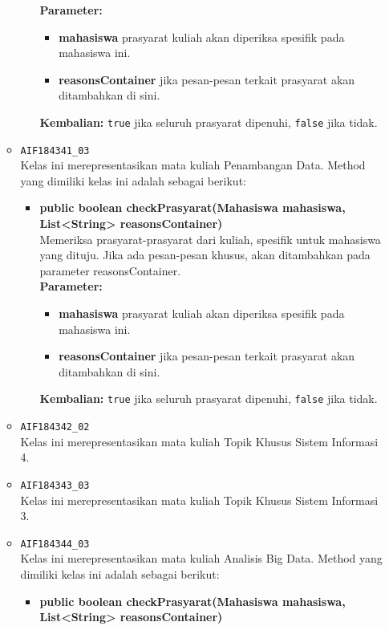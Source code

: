 \begin{enumerate}
\begin{itemize}
\begin{itemize}
			\textbf{Parameter:}
			\begin{itemize}
				\item \textbf{mahasiswa} prasyarat kuliah akan diperiksa spesifik pada mahasiswa ini.
				\item \textbf{reasonsContainer} jika pesan-pesan terkait prasyarat akan ditambahkan di sini.
			\end{itemize}
			\textbf{Kembalian:} \texttt{true} jika seluruh prasyarat dipenuhi, \texttt{false} jika tidak.
		\end{itemize}
		\item \texttt{AIF184341\_03} \\
		Kelas ini merepresentasikan mata kuliah Penambangan Data. Method yang dimiliki kelas ini adalah sebagai berikut: 
		\begin{itemize}
			\item \textbf{public boolean checkPrasyarat(Mahasiswa mahasiswa, List<String> reasonsContainer)}\\
			Memeriksa prasyarat-prasyarat dari kuliah, spesifik untuk mahasiswa yang dituju. Jika ada pesan-pesan khusus, akan ditambahkan pada parameter reasonsContainer.\\
			\textbf{Parameter:}
			\begin{itemize}
				\item \textbf{mahasiswa} prasyarat kuliah akan diperiksa spesifik pada mahasiswa ini.
				\item \textbf{reasonsContainer} jika pesan-pesan terkait prasyarat akan ditambahkan di sini.
			\end{itemize}
			\textbf{Kembalian:} \texttt{true} jika seluruh prasyarat dipenuhi, \texttt{false} jika tidak.
		\end{itemize}
		\item \texttt{AIF184342\_02} \\
		Kelas ini merepresentasikan mata kuliah Topik Khusus Sistem Informasi 4.
		\item \texttt{AIF184343\_03} \\
		Kelas ini merepresentasikan mata kuliah Topik Khusus Sistem Informasi 3.
		\item \texttt{AIF184344\_03} \\
		Kelas ini merepresentasikan mata kuliah Analisis Big Data. Method yang dimiliki kelas ini adalah sebagai berikut: 
		\begin{itemize}
			\item \textbf{public boolean checkPrasyarat(Mahasiswa mahasiswa, List<String> reasonsContainer)}\\

\end{itemize}
\end{itemize}
\end{enumerate}
